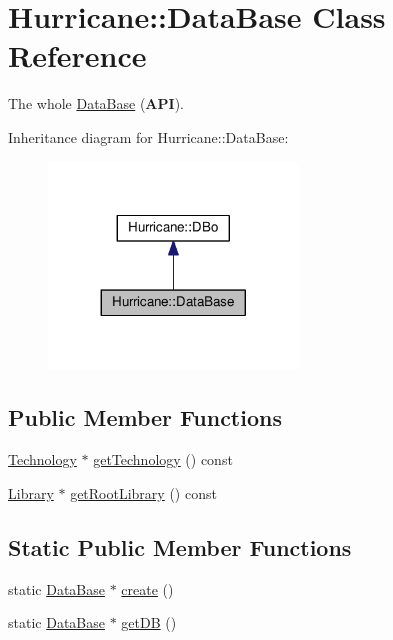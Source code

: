 \hypertarget{classHurricane_1_1DataBase}{}\section{Hurricane\+:\+:Data\+Base Class Reference}
\label{classHurricane_1_1DataBase}


The whole \mbox{\hyperlink{classHurricane_1_1DataBase}{Data\+Base}} ({\bfseries A\+PI}).  




Inheritance diagram for Hurricane\+:\+:Data\+Base\+:\nopagebreak
\begin{figure}[H]
\begin{center}
\leavevmode
\includegraphics[width=188pt]{classHurricane_1_1DataBase__inherit__graph}
\end{center}
\end{figure}
\subsection*{Public Member Functions}
\begin{DoxyCompactItemize}
\item 
\mbox{\hyperlink{classHurricane_1_1Technology}{Technology}} $\ast$ \mbox{\hyperlink{classHurricane_1_1DataBase_a144480c54b0f9fbda57622ad6767ab8a}{get\+Technology}} () const
\item 
\mbox{\hyperlink{classHurricane_1_1Library}{Library}} $\ast$ \mbox{\hyperlink{classHurricane_1_1DataBase_a4469391a3c5ae82caf090f1bdac4f29b}{get\+Root\+Library}} () const
\end{DoxyCompactItemize}
\subsection*{Static Public Member Functions}
\begin{DoxyCompactItemize}
\item 
static \mbox{\hyperlink{classHurricane_1_1DataBase}{Data\+Base}} $\ast$ \mbox{\hyperlink{classHurricane_1_1DataBase_af0210f9bb13faf06e12eb135eeea9b06}{create}} ()
\item 
static \mbox{\hyperlink{classHurricane_1_1DataBase}{Data\+Base}} $\ast$ \mbox{\hyperlink{classHurricane_1_1DataBase_a53d0b9fcd06b73f3968c8f238f377a88}{get\+DB}} ()
\end{DoxyCompactItemize}


